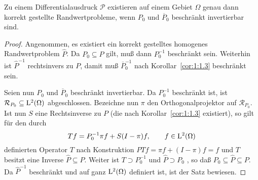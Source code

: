 \begin{thm}[Vi\v{s}ik]
Zu einem Differentialausdruck $\mathcal P$ existieren auf einem Gebiet $\Omega$ genau dann korrekt gestellte Randwertprobleme, wenn $P_0$ und $\overline P_0$
beschr\"ankt invertierbar sind.
\end{thm} 
\begin{proof} 
Angenommen, es existiert ein korrekt gestelltes homogenes Randwertproblem $\widehat P$. Da $P_0\subseteq \widehat P$ gilt, muß dann $P_0^{-1}$ beschränkt sein. Weiterhin ist $\widehat P^{-1}$ rechtsinvers zu $P$, damit muß $\overline P_0^{-1}$ nach Korollar~\ref{cor:1:1.3} beschränkt sein.

Seien nun $P_0$ und $\overline P_0$ beschränkt invertierbar. Da $P_0^{-1}$ beschr\"ankt ist, ist $\mathcal R_{P_0}\subseteq \mathrm L^2(\Omega)$ abgeschlossen.  Bezeichne nun $\pi$ den Orthogonalprojektor auf $\mathcal R_{P_0}$. Ist nun $S$ eine Rechtsinverse zu $P$ (die nach  Korollar~\ref{cor:1:1.3} existiert), so gilt für
den durch  
\begin{equation}
  Tf = P_0^{-1} \pi f + S(I-\pi) f,\qquad f\in\mathrm L^2(\Omega) 
\end{equation}
definierten Operator $T$ nach Konstruktion $PT f = \pi f + (I-\pi) f = f$ und $T$ besitzt eine Inverse $\widehat P \subseteq P$. Weiter ist $T\supset P_0^{-1}$ und $\widehat P\supset P_0$ , so daß $P_0\subseteq \widehat P\subseteq P$. Da $\widehat P^{-1}$ beschränkt und auf ganz $\mathrm L^2(\Omega)$ definiert ist, ist der Satz bewiesen.
\end{proof}

